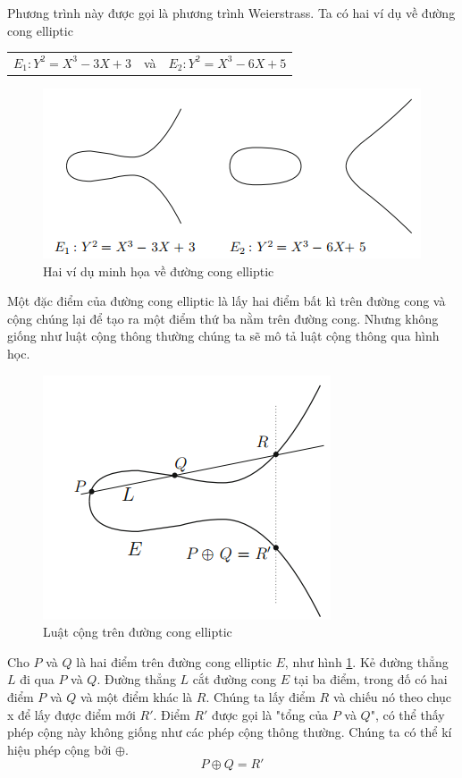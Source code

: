 \documentclass[a4paper,12pt]{report}
\begin{document}
Phương trình này được gọi là phương trình Weierstrass. Ta có hai ví dụ về đường cong elliptic

\begin{center}
\begin{tabular}{ccc}
$E_1: Y^2 = X^3 - 3X + 3$ & và & $E_2: Y^2 = X^3 - 6X + 5$ 
\end{tabular}
\end{center}
\begin{figure}[h]
\begin{center}
\includegraphics[scale=1]{../im1.png}
\caption{Hai ví dụ minh họa về đường cong elliptic}
\end{center}
\end{figure}
Một đặc điểm của đường cong elliptic là lấy hai điểm bất kì trên đường cong và cộng chúng lại để tạo ra một điểm thứ ba nằm trên đường cong. Nhưng không giống như luật cộng thông thường chúng ta sẽ mô tả luật cộng thông qua hình học.
\begin{figure}[h] \label{h2.2}
\begin{center}
\includegraphics[scale=1]{../im2.png}
\caption{Luật cộng trên đường cong elliptic}
\end{center}
\end{figure}

Cho $P$ và $Q$ là hai điểm trên đường cong elliptic $E$, như hình \ref{h2.2}. Kẻ đường thẳng $L$ đi qua $P$ và $Q$. Đường thẳng $L$ cắt đường cong $E$ tại ba điểm, trong đố có hai điểm $P$ và $Q$ và một điểm khác là $R$. Chúng ta lấy điểm $R$ và chiếu nó theo chục x để lấy được điểm mới $R'$. Điểm $R'$ được gọi là "tổng của $P$ và $Q$", có thể thấy phép cộng này không giống như các phép cộng thông thường. Chúng ta có thể kí hiệu phép cộng bởi $\oplus$.
\begin{displaymath}
P \oplus Q = R'
\end{displaymath}
\end{document}
